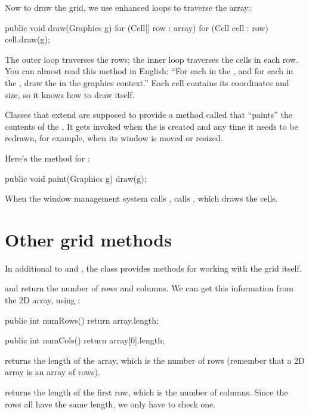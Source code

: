 Now to draw the grid, we use enhanced  loops to traverse the array:

\begin{code}
public void draw(Graphics g) {
    for (Cell[] row : array) {
        for (Cell cell : row) {
            cell.draw(g);
        }
    }
}
\end{code}

The outer loop traverses the rows; the inner loop traverses the cells in each row.
You can almost read this method in English: ``For each  in the , and for each  in the , draw the  in the graphics context.''
Each cell contains its coordinates and size, so it knows how to draw itself.

Classes that extend  are supposed to provide a method called  that ``paints'' the contents of the .
It gets invoked when the  is created and any time it needs to be redrawn, for example, when its window is moved or resized.

Here's the  method for :

\begin{code}
public void paint(Graphics g) {
    draw(g);
}
\end{code}

When the window management system calls ,  calls , which draws the cells.

\section{Other grid methods}

In additional to  and , the  class provides methods for working with the grid itself.

 and  return the number of rows and columns.
We can get this information from the 2D array, using :

\begin{code}
public int numRows() {
    return array.length;
}

public int numCols() {
    return array[0].length;
}
\end{code}

 returns the length of the array, which is the number of rows (remember that a 2D array is an array of rows).

 returns the length of the first row, which is the number of columns.
Since the rows all have the same length, we only have to check one.

